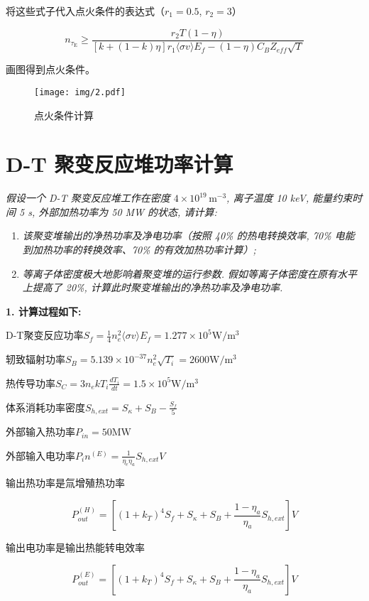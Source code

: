 \documentclass{article}
\begin{document}
将这些式子代入点火条件的表达式（$r_1=0.5$, $r_2=3$）

$$n_{\tau _{\mathrm{E}}} \geq \frac { r_2 T(1-\eta ) } { [k+(1-k)\eta ]r_1 \langle \sigma v \rangle E_f -(1-\eta )C_B Z_{eff}\sqrt{T}}$$

画图得到点火条件。

\begin{figure}[htpb]
    \centering
    \texttt{[image: img/2.pdf]}
    \caption{点火条件计算}
    \label{fig:2}
\end{figure}

\section{D-T 聚变反应堆功率计算}
\emph{假设一个 D-T 聚变反应堆工作在密度 $4 \times 10^{19} \, \text{m}^{-3}$, 离子温度 10 keV, 能量约束时间 5 s, 外部加热功率为 50 MW 的状态, 请计算:}
\begin{enumerate}
    \item \emph{该聚变堆输出的净热功率及净电功率（按照 40\% 的热电转换效率, 70\% 电能到加热功率的转换效率、70\% 的有效加热功率计算）; }
    \item \emph{等离子体密度极大地影响着聚变堆的运行参数. 假如等离子体密度在原有水平上提高了 20\%, 计算此时聚变堆输出的净热功率及净电功率. }
\end{enumerate}

\textbf{1. 计算过程如下:}

D-T聚变反应功率$S_f = \frac{1}{4} n_e^2 \langle \sigma v \rangle E_f = 1.277 \times 10^5 \text{W}/\text{m}^3$

轫致辐射功率$S_B = 5.139\times 10^{-37} n_e^2 \sqrt{T_i} = 2600\text{W}/\text{m}^3$

热传导功率$S_C = 3n_e k T_i \frac{d T_i}{d t} = 1.5 \times 10^5 \text{W}/\text{m}^3$

体系消耗功率密度$S_{h,ext}=S_\kappa +S_B -\frac{S_f}{5}$

外部输入热功率$P_{in} = 50\text{MW}$

外部输入电功率$P_in^{(E)} = \frac{1}{\eta_e\eta_a}S_{h,ext}V$

输出热功率是氚增殖热功率

$$P_{out}^{(H)} = \left[ \left( 1 + k_T \right)^4 S_f + S_\kappa + S_B + \frac{1 - \eta_a}{\eta_a} S_{h,ext} \right] V$$

输出电功率是输出热能转电效率

$$P_{out}^{(E)} = \left[ \left( 1 + k_T \right)^4 S_f + S_\kappa + S_B + \frac{1 - \eta_a}{\eta_a} S_{h,ext} \right] V $$
\end{document}
